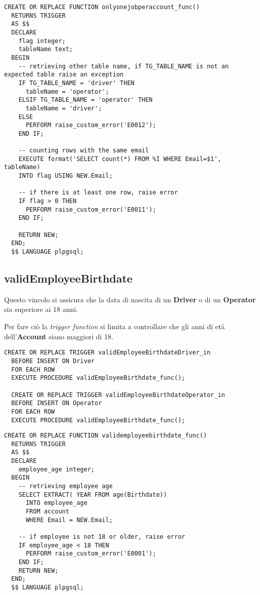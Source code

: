 \begin{lstlisting}[caption={Funzione per il vincolo \textbf{onlyOneJobPerAccount}}]
  CREATE OR REPLACE FUNCTION onlyonejobperaccount_func()
  RETURNS TRIGGER
  AS $$
  DECLARE
    flag integer;
    tableName text;
  BEGIN
    -- retrieving other table name, if TG_TABLE_NAME is not an expected table raise an exception
    IF TG_TABLE_NAME = 'driver' THEN
      tableName = 'operator';
    ELSIF TG_TABLE_NAME = 'operator' THEN
      tableName = 'driver';
    ELSE 
      PERFORM raise_custom_error('E0012');
    END IF;

    -- counting rows with the same email
    EXECUTE format('SELECT count(*) FROM %I WHERE Email=$1', tableName) 
    INTO flag USING NEW.Email;

    -- if there is at least one row, raise error
    IF flag > 0 THEN
      PERFORM raise_custom_error('E0011');
    END IF;

    RETURN NEW;
  END;
  $$ LANGUAGE plpgsql;
\end{lstlisting}

\subsection{\textbf{validEmployeeBirthdate}}

Questo vincolo si assicura che la data di nascita di un \textbf{Driver} o di un \textbf{Operator} sia superiore ai 18 anni.

Per fare ciò la \textit{trigger function} si limita a controllare che gli anni di età dell'\textbf{Account} siano maggiori di 18.

\begin{lstlisting}[caption={Trigger per il vincolo \textbf{validEmployeeBirthdate}}]
  CREATE OR REPLACE TRIGGER validEmployeeBirthdateDriver_in
  BEFORE INSERT ON Driver
  FOR EACH ROW
  EXECUTE PROCEDURE validEmployeeBirthdate_func();

  CREATE OR REPLACE TRIGGER validEmployeeBirthdateOperator_in
  BEFORE INSERT ON Operator
  FOR EACH ROW
  EXECUTE PROCEDURE validEmployeeBirthdate_func();
\end{lstlisting}

\begin{lstlisting}[caption={Funzione per il vincolo \textbf{validEmployeeBirthdate}}]
  CREATE OR REPLACE FUNCTION validemployeebirthdate_func()
  RETURNS TRIGGER
  AS $$
  DECLARE
    employee_age integer;
  BEGIN
    -- retrieving employee age
    SELECT EXTRACT( YEAR FROM age(Birthdate))
      INTO employee_age
      FROM account
      WHERE Email = NEW.Email;

    -- if employee is not 18 or older, raise error
    IF employee_age < 18 THEN
      PERFORM raise_custom_error('E0001');
    END IF;
    RETURN NEW;
  END;
  $$ LANGUAGE plpgsql;
\end{lstlisting}

